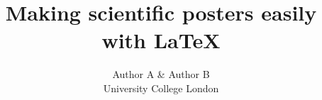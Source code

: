 \documentclass{a0poster}
\begin{document}
\newsavebox\envbox 					%

\newenvironment{Section}[1]				%
{
\par 
\flushleft
\colorbox{boxcol}{%
\sffamily\large\color{headingcol}> \color{white} #1%
\hspace{0.5cm}}
\par\nobreak 
\nointerlineskip 						%
\setlength\parskip{-1pt}					%
\begin{lrbox}\envbox						%
\begin{minipage}{0.95\columnwidth}		%
}
{\par
\end{minipage}\end{lrbox}				%
\fcolorbox{boxcol}{fillcol}{\usebox\envbox}	%
\vspace{1cm}							%
} 

\title{Making scientific posters easily with \LaTeX}

\author{Author A \& Author B\\
University College London}
\end{document}
